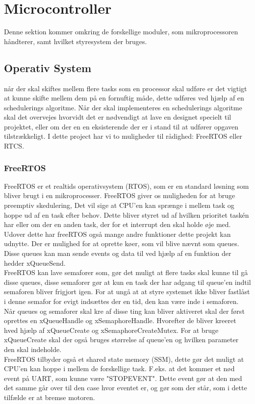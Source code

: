 \section{Microcontroller}

Denne sektion kommer omkring de forskellige moduler, som mikroprocessoren håndterer, samt hvilket styresystem der bruges.

\subsection{Operativ System}
når der skal skiftes mellem flere tasks som en processor skal udføre er det vigtigt at kunne skifte mellem dem på en fornuftig måde, dette udføres ved hjælp af en schedulerings algoritme. Når der skal implementeres en schedulerings algoritme skal det overvejes hvorvidt det er nødvendigt at lave en designet specielt til projektet, eller om der en en eksisterende der er i stand til at udfører opgaven tilstrækkeligt. I dette project har vi to muligheder til rådighed: FreeRTOS\cite{FreeRTOSorg} eller RTCS.

\subsubsection{FreeRTOS}

FreeRTOS \cite{FreeRTOSorg} er et realtids operativsystem (RTOS), som er en standard løsning som bliver brugt i en mikroprocesser. FreeRTOS giver os muligheden for at bruge preemptiv skedulering, Det vil sige at CPU'en kan sprænge i mellem task og hoppe ud af en task efter behov. Dette bliver styret ud af hvilken prioritet taskén har eller om der en anden task, der for et interrupt den skal holde øje med.
\\
Udover dette har freeRTOS også mange andre funktioner dette projekt kan udnytte. Der er mulighed for at oprette køer, som vil blive nævnt som queues. Disse queues kan man sende events og data til ved hjælp af en funktion der hedder xQueueSend. 
\\
FreeRTOS kan lave semaforer som, gør det muligt at flere tasks skal kunne til gå disse queues, disse semaforer gør at kun en task der har adgang til queue'en indtil semaforen bliver frigjort igen. For at ungå at at styre systemet ikke bliver fastlåst i denne semafor for evigt indsættes der en tid, den kan være inde i semaforen.
\\
Når queues og semaforer skal kre af disse ting kan bliver aktiveret skal der først oprettes en xQueueHandle og xSemaphoreHandle. Hvorefter de bliver kreeret hved hjælp af xQueueCreate og xSemaphoreCreateMutex. For at bruge xQueueCreate skal der også bruges størrelse af queue'en og hvilken parameter den skal indeholde.
\\
FreeRTOS tilbyder også et shared state memory (SSM), dette gør det muligt at CPU'en kan hoppe i mellem de forskellige task. F.eks. at det kommer et nød event på UART, som kunne være "STOP\textunderscore EVENT". Dette event gør at den med det samme går over til den case hvor eventet er, og gør som der står, som i dette tilfælde er at bremse motoren.

